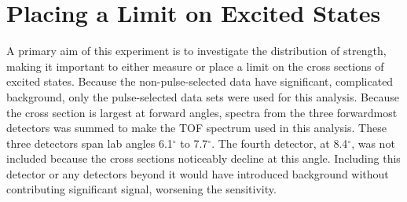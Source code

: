 
\section{Placing a Limit on Excited \zp States}
\label{sec:zpLimit}

A primary aim of this experiment is to investigate the distribution of \zp strength, making it important to either measure or place a limit on the cross sections of excited \zp states.  Because the non-pulse-selected data have significant, complicated background, only the pulse-selected data sets were used for this analysis.  Because the \zp cross section is largest at forward angles, spectra from the three forwardmost detectors was summed to make the TOF spectrum used in this analysis.  These three detectors span lab angles 6.1$^{\circ}$ to 7.7$^{\circ}$.  The fourth detector, at 8.4$^{\circ}$, was not included because the \zp cross sections noticeably decline at this angle.  Including this detector or any detectors beyond it would have introduced background without contributing significant signal, worsening the sensitivity.    

